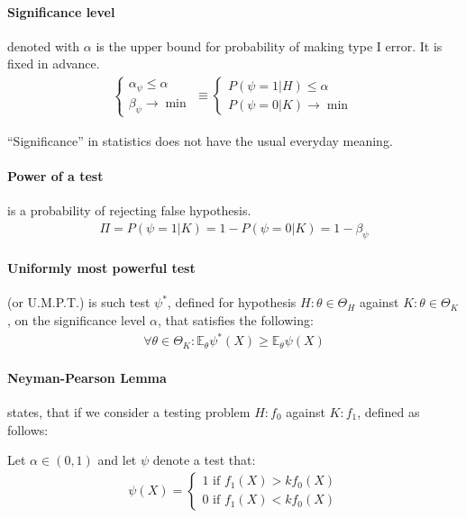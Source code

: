 \paragraph{Significance level}
denoted with $\alpha$ is the upper bound for probability of making type I error. It is fixed in
advance.
\begin{gather*}
\begin{cases}
\alpha_\psi \leq \alpha \\
\beta_\psi \rightarrow \min
\end{cases} \equiv 
\begin{cases}
P(\psi = 1 | H) \leq \alpha \\
P(\psi = 0 | K) \rightarrow \min
\end{cases}
\end{gather*}

``Significance'' in statistics does not have the usual everyday meaning.

\paragraph{Power of a test}
is a probability of rejecting false hypothesis.
\begin{gather*}
\Pi = P(\psi = 1 | K) = 1 - P(\psi = 0 | K) = 1 - \beta_\psi
\end{gather*}

\paragraph{Uniformly most powerful test}
(or U.M.P.T.) is such test $\psi^*$, defined for hypothesis $H: \theta \in \Theta_H$ against $K: \theta \in
\Theta_K$, on the significance level $\alpha$, that satisfies the following:
\begin{gather*}
\forall \theta \in \Theta_K : \mathbb{E}_\theta \psi^*(X) \geq \mathbb{E}_\theta \psi(X)
\end{gather*}

\paragraph{Neyman-Pearson Lemma}
states, that if we consider a testing problem $H: f_0$ against $K: f_1$, defined as follows:

Let $\alpha \in (0,1)$ and let $\psi$ denote a test that:
\begin{gather*}
\psi(X) = \begin{cases}
1 \mbox{ if } f_1(X) > k f_0(X) \\
0 \mbox{ if } f_1(X) < k f_0(X)
\end{cases}
\label{eq:neymanpearson1} \tag{A}
\end{gather*}

